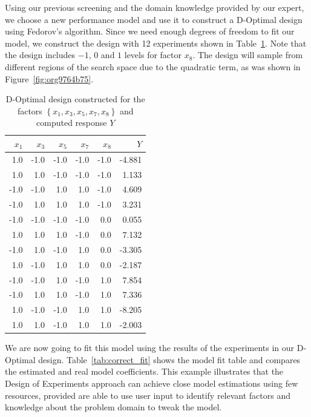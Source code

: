 \documentclass[conference]{IEEEtran}
\begin{document}
Using our previous screening and the domain knowledge provided by our expert, we
choose a new performance model and use it to construct a D-Optimal design using
Fedorov's algorithm. Since we need enough degrees of freedom to fit our model,
we construct the design with 12 experiments shown in Table~\ref{tab:d_optimal}.
Note that the design includes \(-1\), \(0\) and \(1\) levels for factor \(x_8\). The design
will sample from different regions of the search space due to the quadratic term,
as was shown in Figure~\ref{fig:org9764b75}.

\begin{table}[ht]
\centering
\caption{D-Optimal design constructed for the factors $\left\{x_1,x_3,x_5,x_7,x_8\right\}$ and computed response $Y$}
\label{tab:d_optimal}
\begingroup\footnotesize
\begin{tabular}{rrrrrr}
  \toprule
$x_1$ & $x_3$ & $x_5$ & $x_7$ & $x_8$ & $Y$ \\
  \midrule
1.0 & -1.0 & -1.0 & -1.0 & -1.0 & -4.881 \\
  1.0 & 1.0 & -1.0 & -1.0 & -1.0 & 1.133 \\
  -1.0 & -1.0 & 1.0 & 1.0 & -1.0 & 4.609 \\
  -1.0 & 1.0 & 1.0 & 1.0 & -1.0 & 3.231 \\
  -1.0 & -1.0 & -1.0 & -1.0 & 0.0 & 0.055 \\
  1.0 & 1.0 & 1.0 & -1.0 & 0.0 & 7.132 \\
  -1.0 & 1.0 & -1.0 & 1.0 & 0.0 & -3.305 \\
  1.0 & -1.0 & 1.0 & 1.0 & 0.0 & -2.187 \\
  -1.0 & -1.0 & 1.0 & -1.0 & 1.0 & 7.854 \\
  -1.0 & 1.0 & 1.0 & -1.0 & 1.0 & 7.336 \\
  1.0 & -1.0 & -1.0 & 1.0 & 1.0 & -8.205 \\
  1.0 & 1.0 & -1.0 & 1.0 & 1.0 & -2.003 \\
   \bottomrule
\end{tabular}
\endgroup
\end{table}

We are now going to fit this model using the results of the experiments in our
D-Optimal design. Table~\ref{tab:correct_fit} shows the model fit table
and compares the estimated and real model coefficients. This example illustrates
that the Design of Experiments approach can achieve close model estimations
using few resources, provided are able to use user input to identify relevant
factors and knowledge about the problem domain to tweak the model.
\end{document}
